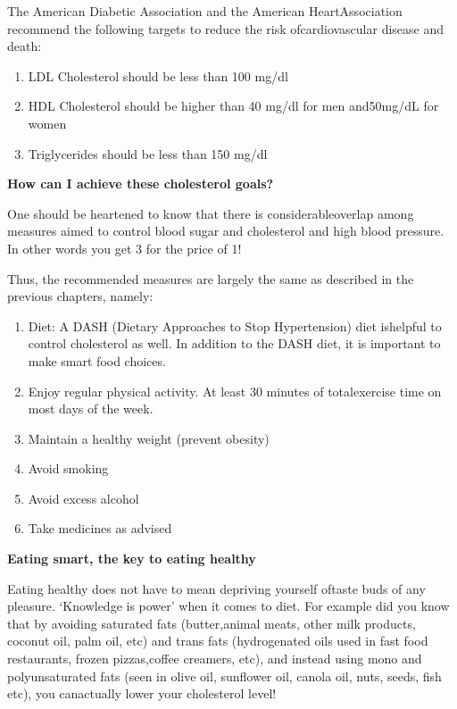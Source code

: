 
The American Diabetic Association and the American Heart\break Association recommend the following targets to reduce the risk of\break cardiovascular disease and death:

\vspace{-\topsep}
\begin{enumerate}[•]
\itemsep=0pt
\item LDL Cholesterol should be less than 100 mg/dl
\item HDL Cholesterol should be higher than 40 mg/dl for men and\break 50mg/dL for women
\item Triglycerides should be less than 150 mg/dl
\end{enumerate}
\vspace{-\topsep}

\noindent\textbf{How can I achieve these cholesterol goals?}

One should be heartened to know that there is considerable\break overlap among measures aimed to control blood sugar and cholesterol and high blood pressure. In other words you get 3 for the price of 1!

Thus, the recommended measures are largely the same as described in the previous chapters, namely:

\vspace{-\topsep}
\begin{enumerate}
\itemsep=0pt
\item Diet: A DASH (Dietary Approaches to Stop Hypertension) diet is\break helpful to control cholesterol as well. In addition to the DASH diet, it is important to make smart food choices.
\item Enjoy regular physical activity. At least 30 minutes of total\break exercise time on most days of the week.
\item Maintain a healthy weight (prevent obesity)
\item Avoid smoking
\item Avoid excess alcohol
\item Take medicines as advised
\end{enumerate}
\vspace{-\topsep}

\noindent\textbf{Eating smart, the key to eating healthy}

Eating healthy does not have to mean depriving yourself of\break taste buds of any pleasure. ‘Knowledge is power’ when it comes to diet. For example did you know that by avoiding saturated fats (butter,\break animal meats, other milk products, coconut oil, palm oil, etc) and trans fats (hydrogenated oils used in fast food restaurants, frozen pizzas,\break coffee creamers, etc), and instead using mono and polyunsaturated fats (seen in olive oil, sunflower oil, canola oil, nuts, seeds, fish etc), you can\break actually lower your cholesterol level!

